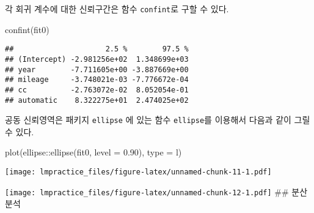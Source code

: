 \documentclass[
]{book}
\newenvironment{Shaded}{\begin{snugshade}}{\end{snugshade}}
\newcommand{\AttributeTok}[1]{\textcolor[rgb]{0.77,0.63,0.00}{#1}}
\newcommand{\FloatTok}[1]{\textcolor[rgb]{0.00,0.00,0.81}{#1}}
\newcommand{\FunctionTok}[1]{\textcolor[rgb]{0.00,0.00,0.00}{#1}}
\newcommand{\NormalTok}[1]{#1}
\newcommand{\SpecialCharTok}[1]{\textcolor[rgb]{0.00,0.00,0.00}{#1}}
\newcommand{\StringTok}[1]{\textcolor[rgb]{0.31,0.60,0.02}{#1}}
\begin{document}
각 회귀 계수에 대한 신뢰구간은 함수 \texttt{confint}로 구할 수 있다.

\begin{Shaded}
\begin{Highlighting}[]
\FunctionTok{confint}\NormalTok{(fit0)}
\end{Highlighting}
\end{Shaded}

\begin{verbatim}
##                     2.5 %        97.5 %
## (Intercept) -2.981256e+02  1.348699e+03
## year        -7.711605e+00 -3.887669e+00
## mileage     -3.748021e-03 -7.776672e-04
## cc          -2.763072e-02  8.052054e-01
## automatic    8.322275e+01  2.474025e+02
\end{verbatim}

공동 신뢰영역은 패키지 \texttt{ellipse} 에 있는 함수 \texttt{ellipse}를 이용해서 다음과 같이 그릴 수 있다.

\begin{Shaded}
\begin{Highlighting}[]
\FunctionTok{plot}\NormalTok{(ellipse}\SpecialCharTok{::}\FunctionTok{ellipse}\NormalTok{(fit0, }\AttributeTok{level =} \FloatTok{0.90}\NormalTok{), }\AttributeTok{type =} \StringTok{\textquotesingle{}l\textquotesingle{}}\NormalTok{)}
\end{Highlighting}
\end{Shaded}

\texttt{[image: lmpractice\_files/figure-latex/unnamed-chunk-11-1.pdf]}

\begin{Shaded}
\end{Shaded}

\texttt{[image: lmpractice\_files/figure-latex/unnamed-chunk-12-1.pdf]}
\#\# 분산분석
\end{document}
